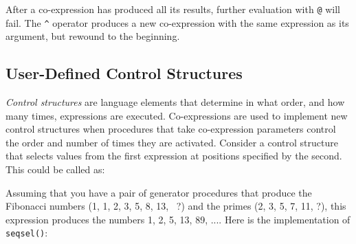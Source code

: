 
After a co-expression has produced all its results, further evaluation
with \texttt{@} will fail. The \texttt{\^{}}
operator produces a new co-expression with the same expression as its
argument, but {\textquotedbl}rewound{\textquotedbl} to the beginning.


\subsection[User{}-Defined Control Structures]{User-Defined Control
Structures}
\textit{Control structures} are language elements
that determine in what order, and how many times, expressions
are executed. Co-expressions are used to implement new
control structures when procedures that take
co-expression parameters control the order and number
of times they are activated.
Consider a control structure that selects values from the first
expression at positions specified by the second. This could be
called as:


Assuming that you have a pair of generator procedures
that produce the Fibonacci numbers (1, 1, 2, 3, 5, 8, 13, \ ?) and the
primes (2, 3, 5, 7, 11, ?), this expression produces the numbers 1, 2,
5, 13, 89, .... Here is the implementation of \texttt{seqsel()}:


